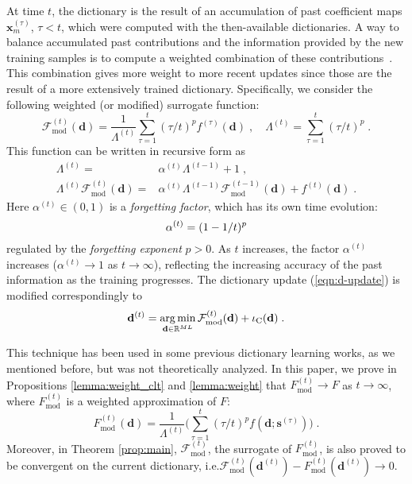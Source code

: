 \documentclass[final]{siamart1116}
\newcommand{\ie}{i.e.\xspace}
\newcommand{\mb}[1]{\mathbf{#1}}
\DeclareMathOperator*{\argmin}{arg\,min}
\def \R  {\mathbb{R}}
\def \F  {\mathcal{F}}
\begin{document}
At time $t$, the dictionary is the result of an accumulation of past coefficient maps $\mb{x}^{(\tau)}_m$, $\tau < t$, which were computed with the then-available dictionaries. A way to balance accumulated past contributions and the information provided by the new training samples is to compute a weighted combination of these contributions~\cite{skretting-2010-recursive, mairal-2010-online, szabo2011online, slavakis2014online}. This combination gives more weight to more recent updates since those are the result of a more extensively trained dictionary. Specifically, we consider the following weighted (or modified) surrogate function:
\begin{equation}
\label{eqn:surrogate_mod_explicit}
\F^{(t)}_{\mathrm{mod}} (\mb{d})= \frac{1}{ \Lambda^{(t)}} \sum_{\tau=1}^t  (\tau/t)^p f^{(\tau)}(\mb{d})\;, \quad \Lambda^{(t)} = \sum_{\tau=1}^t (\tau/t)^p \;.
\end{equation}
This function can be written in recursive form as
\begin{align}
\Lambda^{(t)} =& \alpha^{(t)} \Lambda^{(t-1)} + 1 \label{eqn:Lambda} \;,\\
\Lambda^{(t)}\F^{(t)}_{\mathrm{mod}} (\mb{d}) =& \alpha^{(t)} \Lambda^{(t-1)} \F^{(t-1)}_{\mathrm{mod}}(\mb{d}) + f^{(t)}(\mb{d}) \label{eqn:surrogate_mod} \;.
\end{align}
Here $\alpha^{(t)}\in (0,1)$ is a \emph{forgetting factor}, which has its own time evolution:
\vspace{-1mm}
\begin{equation}
\label{eqn:forget}
\alpha^{(t)} = (1-1/t)^p
\vspace{-1mm}
\end{equation}
regulated by the \emph{forgetting exponent} $p>0$. As $t$ increases, the factor $\alpha^{(t)}$ increases ($\alpha^{(t)} \to 1$ as $t \to \infty$), reflecting the increasing accuracy of the past information as the training progresses.
The dictionary update  (\ref{eqn:d-update}) is  modified correspondingly to
\vspace{-2mm}
\begin{equation}
\label{eqn:d-update-mod}
\mb{d}^{(t)} = \argmin_{\mb{d}\in\R^{ML}} \F^{(t)}_{\mathrm{mod}}(\mb{d}) + \iota_{\mathrm{C}}(\mb{d}) \;.
\vspace{-2mm}
\end{equation}

This technique has been used in some previous dictionary learning works, as we mentioned before, but was not theoretically analyzed. In this paper, we prove in Propositions \ref{lemma:weight_clt} and \ref{lemma:weight} that $F^{(t)}_{\mathrm{mod}} \to F$ as $t\to\infty$, where $F^{(t)}_{\mathrm{mod}}$ is a weighted approximation of $F$:
\begin{equation}
\label{eqn:F}
F^{(t)}_{\mathrm{mod}}(\mb{d}) = \frac{1}{\Lambda^{(t)}}\Big(\sum_{\tau=1}^t (\tau/t)^p f(\mb{d};\mb{s}^{(\tau)})\Big) \;.
\end{equation}
Moreover, in Theorem \ref{prop:main}, $\F^{(t)}_{\mathrm{mod}}$, the surrogate of $F^{(t)}_{\mathrm{mod}}$, is also proved to be convergent on the current dictionary, \ie $\F^{(t)}_{\mathrm{mod}}(\mb{d}^{(t)}) - F^{(t)}_{\mathrm{mod}}(\mb{d}^{(t)}) \to 0$.
\end{document}
